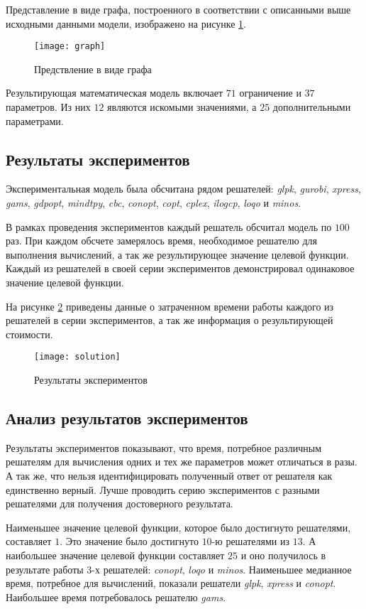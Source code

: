 Представление в виде графа, построенного в соответствии с описанными выше исходными данными модели, изображено на рисунке \ref{fig:graph}.

\begin{figure}[H]
  \centering
  \texttt{[image: graph]}
  \caption{Предствление в виде графа}
  \label{fig:graph}
\end{figure}


Результирующая математическая модель включает $71$ ограничение и $37$ параметров. Из них $12$ являются искомыми значениями, а $25$ дополнительными параметрами.

\subsection*{Результаты экспериментов}
Экспериментальная модель была обсчитана рядом решателей: \textit{glpk}, \textit{gurobi}, \textit{xpress}, \textit{gams}, \textit{gdpopt}, \textit{mindtpy}, \textit{cbc}, \textit{conopt}, \textit{copt}, \textit{cplex}, \textit{ilogcp}, \textit{loqo} и \textit{minos}.

В рамках проведения экспериментов каждый решатель обсчитал модель по $100$ раз. При каждом обсчете замерялось время, необходимое решателю для выполнения вычислений, а так же результирующее значение целевой функции. Каждый из решателей в своей серии экспериментов демонстрировал одинаковое значение целевой функции.

На рисунке \ref{fig:solution} приведены данные о затраченном времени работы каждого из решателей в серии экспериментов, а так же информация о результирующей стоимости.

\begin{figure}[H]
  \centering
  \texttt{[image: solution]}
  \caption{Результаты экспериментов}
  \label{fig:solution}
\end{figure}

\subsection*{Анализ результатов экспериментов}
Результаты экспериментов показывают, что время, потребное различным решателям для вычисления одних и тех же параметров может отличаться в разы. А так же, что нельзя идентифицировать полученный ответ от решателя как единственно верный. Лучше проводить серию экспериментов с разными решателями для получения достоверного результата.

Наименьшее значение целевой функции, которое было достигнуто решателями, составляет $1$. Это значение было достигнуто $10$-ю решателями из $13$. А наибольшее значение целевой функции составляет $25$ и оно получилось в результате работы $3$-х решателей: \textit{conopt}, \textit{loqo} и \textit{minos}. Наименьшее медианное время, потребное для вычислений, показали решатели \textit{glpk}, \textit{xpress} и \textit{conopt}. Наибольшее время потребовалось решателю \textit{gams}.
